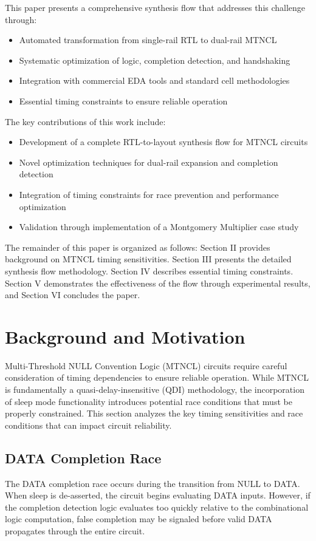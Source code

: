 \documentclass[conference]{IEEEtran}
\begin{document}
This paper presents a comprehensive synthesis flow that addresses this challenge through:
\begin{itemize}
\item Automated transformation from single-rail RTL to dual-rail MTNCL
\item Systematic optimization of logic, completion detection, and handshaking
\item Integration with commercial EDA tools and standard cell methodologies
\item Essential timing constraints to ensure reliable operation
\end{itemize}

The key contributions of this work include:
\begin{itemize}
\item Development of a complete RTL-to-layout synthesis flow for MTNCL circuits
\item Novel optimization techniques for dual-rail expansion and completion detection
\item Integration of timing constraints for race prevention and performance optimization
\item Validation through implementation of a Montgomery Multiplier case study
\end{itemize}

The remainder of this paper is organized as follows: Section II provides background on MTNCL timing sensitivities. Section III presents the detailed synthesis flow methodology. Section IV describes essential timing constraints. Section V demonstrates the effectiveness of the flow through experimental results, and Section VI concludes the paper.

\section{Background and Motivation}
Multi-Threshold NULL Convention Logic (MTNCL) circuits require careful consideration of timing dependencies to ensure reliable operation. While MTNCL is fundamentally a quasi-delay-insensitive (QDI) methodology, the incorporation of sleep mode functionality introduces potential race conditions that must be properly constrained. This section analyzes the key timing sensitivities and race conditions that can impact circuit reliability.

\subsection{DATA Completion Race}
The DATA completion race occurs during the transition from NULL to DATA. When sleep is de-asserted, the circuit begins evaluating DATA inputs. However, if the completion detection logic evaluates too quickly relative to the combinational logic computation, false completion may be signaled before valid DATA propagates through the entire circuit.
\end{document}
